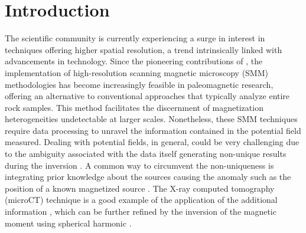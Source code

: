 \section{Introduction}

The scientific community is currently experiencing a surge in interest in techniques offering higher spatial resolution, a trend intrinsically linked with advancements in technology. Since the pioneering contributions of \citet{Egli2000}, the implementation of high-resolution scanning magnetic microscopy (SMM) methodologies has become increasingly feasible in paleomagnetic research, offering an alternative to conventional approaches that typically analyze entire rock samples. This method facilitates the discernment of magnetization heterogeneities undetectable at larger scales. Nonetheless, these SMM techniques require data processing to unravel the information contained in the potential field measured. Dealing with potential fields, in general, could be very challenging due to the ambiguity associated with the data itself generating non-unique results during the inversion \citep{Blakely1996}. A common way to circumvent the non-uniqueness is integrating prior knowledge about the sources causing the anomaly such as the position of a known magnetized source \citep{Fabian2019}. The X-ray computed tomography (microCT) technique is a good example of the application of the additional information \citep[\textit{e.g.}][]{DeGroot2018, DeGroot2021, Koster2023}, which can be further refined by the inversion of the magnetic moment using spherical harmonic \citep[\textit{e.g.}][]{CortesOrtuno2021, CortesOrtuno2022}.

